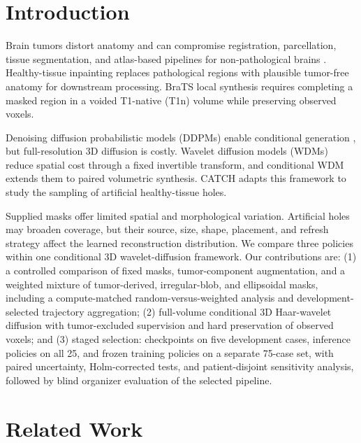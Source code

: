 \documentclass[runningheads]{llncs}
\begin{document}
\section{Introduction} \label{sec:introduction}

Brain tumors distort anatomy and can compromise registration, parcellation, tissue segmentation, and atlas-based pipelines for non-pathological brains \cite{mehdipour2025fast}. Healthy-tissue inpainting replaces pathological regions with plausible tumor-free anatomy for downstream processing. BraTS local synthesis \cite{kofler2023inpainting} requires completing a masked region in a voided T1-native (T1n) volume while preserving observed voxels.

Denoising diffusion probabilistic models (DDPMs) \cite{ho2020ddpm} enable conditional generation \cite{lugmayr2022repaint,saharia2022palette}, but full-resolution 3D diffusion is costly. Wavelet diffusion models (WDMs) \cite{friedrich2024wdm} reduce spatial cost through a fixed invertible transform, and conditional WDM \cite{friedrich2024cwdm} extends them to paired volumetric synthesis. CATCH adapts this framework to study the sampling of artificial healthy-tissue holes.

Supplied masks offer limited spatial and morphological variation. Artificial holes may broaden coverage, but their source, size, shape, placement, and refresh strategy affect the learned reconstruction distribution. We compare three policies within one conditional 3D wavelet-diffusion framework. Our contributions are: (1) a controlled comparison of fixed masks, tumor-component augmentation, and a weighted mixture of tumor-derived, irregular-blob, and ellipsoidal masks, including a compute-matched random-versus-weighted analysis and development-selected trajectory aggregation; (2) full-volume conditional 3D Haar-wavelet diffusion with tumor-excluded supervision and hard preservation of observed voxels; and (3) staged selection: checkpoints on five development cases, inference policies on all 25, and frozen training policies on a separate 75-case set, with paired uncertainty, Holm-corrected tests, and patient-disjoint sensitivity analysis, followed by blind organizer evaluation of the selected pipeline.


\section{Related Work} \label{sec:related-work}
\end{document}
